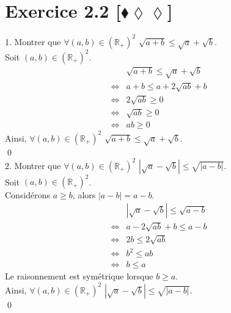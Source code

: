 \documentclass[10pt]{article}
\begin{document}
\section*{Exercice 2.2 [$\blacklozenge\lozenge\lozenge$]}
\begin{tcolorbox}[enhanced, width=7in, center, size=fbox, fontupper=\large, drop shadow southwest]
    1. Montrer que $\forall(a,b)\in(\mathbb{R}_+)^2$ $\sqrt{a+b}\leq\sqrt{a}+\sqrt{b}$.\\
    Soit $(a,b)\in(\mathbb{R}_+)^2$.
    \begin{align*}
        &\sqrt{a+b}\leq\sqrt{a}+\sqrt{b}\\
        \iff&a+b\leq a + 2\sqrt{ab} + b\\
        \iff&2\sqrt{ab} \geq 0\\
        \iff&\sqrt{ab} \geq 0\\
        \iff&ab \geq 0
    \end{align*}
    Ainsi, $\forall(a,b)\in(\mathbb{R}_+)^2$ $\sqrt{a+b}\leq\sqrt{a}+\sqrt{b}$.\\
    \qed\\
    2. Montrer que $\forall(a,b)\in(\mathbb{R}_+)^2$ $|\sqrt{a}-\sqrt{b}|\leq\sqrt{|a-b|}$.\\
    Soit $(a,b)\in(\mathbb{R}_+)^2$.\\
    Considérons $a\geq b$, alors $|a-b| = a-b$.
    \begin{align*}
        &|\sqrt{a}-\sqrt{b}|\leq\sqrt{a-b}\\
        \iff& a - 2\sqrt{ab} + b \leq a-b\\
        \iff& 2b \leq 2\sqrt{ab}\\
        \iff& b^2 \leq ab\\
        \iff&b \leq a
    \end{align*}
    Le raisonnement est symétrique lorsque $b\geq a$.\\
    Ainsi, $\forall(a,b)\in(\mathbb{R}_+)^2$ $|\sqrt{a}-\sqrt{b}|\leq\sqrt{|a-b|}$.\\
    \qed
\end{tcolorbox}
\end{document}
